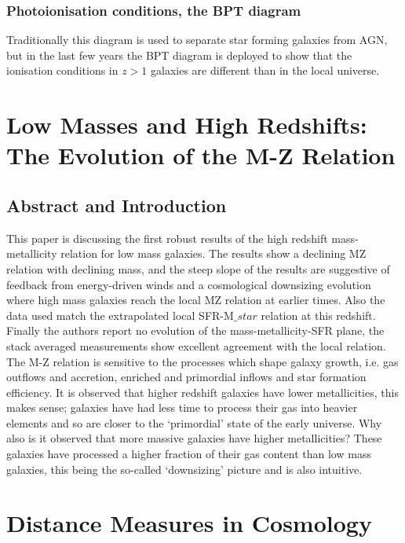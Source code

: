 \documentclass{literature}
\begin{document}
\subsubsection{Photoionisation conditions, the BPT diagram}
Traditionally this diagram is used to separate star forming galaxies from AGN, but in the last few years the BPT diagram is deployed to show that the ionisation conditions in $z > 1$ galaxies are different than in the local universe. 




\section{Low Masses and High Redshifts: The Evolution of the M-Z Relation}
\subsection{Abstract and Introduction}
This paper is discussing the first robust results of the high redshift mass-metallicity relation for low mass galaxies. The results show a declining MZ relation with declining mass, and the steep slope of the results are suggestive of feedback from energy-driven winds and a cosmological downsizing evolution where high mass galaxies reach the local MZ relation at earlier times. Also the data used match the extrapolated local SFR-M$\_{star}$ relation at this redshift. Finally the authors report no evolution of the mass-metallicity-SFR plane, the stack averaged measurements show excellent agreement with the local relation. \\
The M-Z relation is sensitive to the processes which shape galaxy growth, i.e. gas outflows and accretion, enriched and primordial inflows and star formation efficiency. It is observed that higher redshift galaxies have lower metallicities, this makes sense; galaxies have had less time to process their gas into heavier elements and so are closer to the `primordial' state of the early universe. Why also is it observed that more massive galaxies have higher metallicities? These galaxies have processed a higher fraction of their gas content than low mass galaxies, this being the so-called `downsizing' picture and is also intuitive. 

\section{Distance Measures in Cosmology}\label{sec:cosmology_distance}
\end{document}
